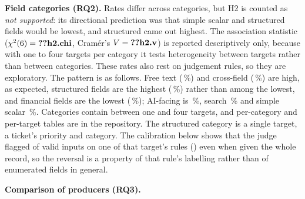 \documentclass[journal]{IEEEtran}
\begin{document}

\textbf{Field categories (RQ2).} 
Rates differ across categories, but H2 is counted as \emph{not supported}: its directional prediction was that simple scalar and structured fields would be lowest,
and structured came out highest. The association statistic ($\chi^2(6)=\R{h2.chi}$, Cram\'er's
$V=\R{h2.v}$) is reported descriptively only, because with one to four targets per category it tests
heterogeneity between targets rather than between categories.\ifjudgeweak{} These rates also rest on
judgement rules, so they are exploratory.\fi{} The pattern is as follows. Free text (\,\%) and
cross-field (\,\%) are high, as expected, structured fields are the highest
(\,\%) rather than among the lowest, and financial fields are the lowest
(\,\%); AI-facing is \,\%, search \,\% and
simple scalar \,\%. Categories contain between one and four targets, and per-category
and per-target tables are in the repository. The
structured category is a single target, a ticket's priority and category. The calibration below shows
that the judge flagged  of  valid inputs on one of that target's rules
() even when given the whole record, so the reversal is a property of that rule's
labelling rather than of enumerated fields in general.

\textbf{Comparison of producers (RQ3).} 
\end{document}
